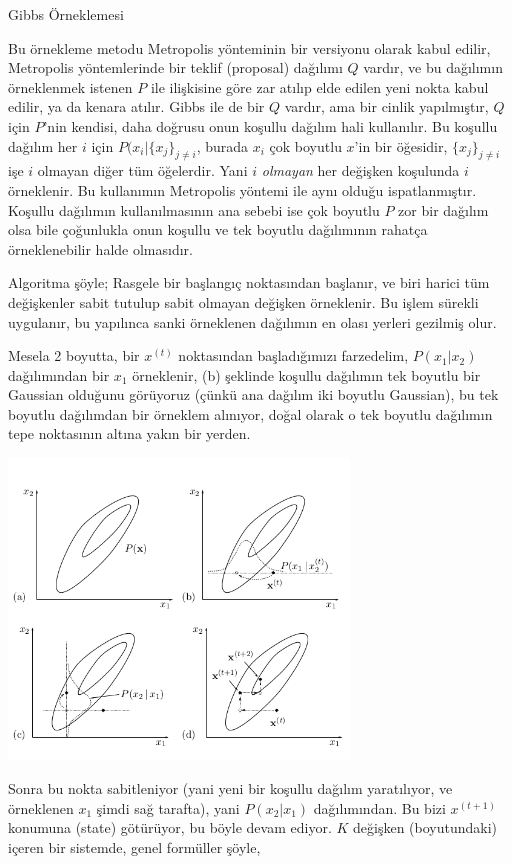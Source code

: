 \documentclass[12pt,fleqn]{article}\usepackage{../../common}
\begin{document}
Gibbs Örneklemesi

Bu örnekleme metodu Metropolis yönteminin bir versiyonu olarak kabul
edilir, Metropolis yöntemlerinde bir teklif (proposal) dağılımı $Q$ vardır,
ve bu dağılımın örneklenmek istenen $P$ ile ilişkisine göre zar atılıp elde
edilen yeni nokta kabul edilir, ya da kenara atılır. Gibbs ile de bir $Q$
vardır, ama bir cinlik yapılmıştır, $Q$ için $P$'nin kendisi, daha doğrusu
onun koşullu dağılım hali kullanılır. Bu koşullu dağılım her $i$ için
$P(x_i|\{x_j\}_{j \ne i}$, burada $x_i$ çok boyutlu $x$'in bir öğesidir,
$\{x_j\}_{j \ne i}$ işe $i$ olmayan diğer tüm öğelerdir. Yani $i$ {\em
  olmayan} her değişken koşulunda $i$ örneklenir. Bu kullanımın Metropolis
yöntemi ile aynı olduğu ispatlanmıştır. Koşullu dağılımın kullanılmasının
ana sebebi ise çok boyutlu $P$ zor bir dağılım olsa bile çoğunlukla onun
koşullu ve tek boyutlu dağılımının rahatça örneklenebilir halde olmasıdır.

Algoritma şöyle; Rasgele bir başlangıç noktasından başlanır, ve biri harici
tüm değişkenler sabit tutulup sabit olmayan değişken örneklenir. Bu işlem
sürekli uygulanır, bu yapılınca sanki örneklenen dağılımın en olası yerleri
gezilmiş olur. 

Mesela 2 boyutta, bir $x^{(t)}$ noktasından başladığımızı farzedelim,
$P(x_1|x_2)$ dağılımından bir $x_1$ örneklenir, (b) şeklinde koşullu
dağılımın tek boyutlu bir Gaussian olduğunu görüyoruz (çünkü ana dağılım
iki boyutlu Gaussian), bu tek boyutlu dağılımdan bir örneklem alınıyor,
doğal olarak o tek boyutlu dağılımın tepe noktasının altına yakın bir
yerden.

\includegraphics[height=8cm]{gibbs.png}

Sonra bu nokta sabitleniyor (yani yeni bir koşullu dağılım yaratılıyor, ve
örneklenen $x_1$ şimdi sağ tarafta), yani $P(x_2|x_1)$ dağılımından. Bu
bizi $x^{(t+1)}$ konumuna (state) götürüyor, bu böyle devam ediyor. $K$
değişken (boyutundaki) içeren bir sistemde, genel formüller şöyle,
\end{document}
